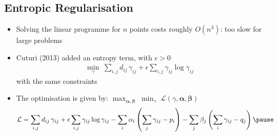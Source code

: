 \begin{slide}
\section[-2]{Entropic Regularisation}

\begin{PauseHighLight}
  \begin{itemize}
  \item Solving the linear programme for $n$ points costs roughly
    $O(n^3)$: too slow for large problems\pause
  \item Cuturi (2013) added an entropy term, with $\epsilon>0$
    \begin{align*}
      \min_{\gamma}\; \sum_{i,j} d_{ij}\,\gamma_{ij} + \epsilon\sum_{i,j}
      \gamma_{ij}\log\gamma_{ij}
    \end{align*}
    with the same constraints\pause
  \item The optimisation is given by: $\displaystyle
    \max_{\bm{\alpha},\bm{\beta}} \; \min_{\gamma}\;
    \mathcal{L}(\gamma, \bm{\alpha}, \bm{\beta})$
    {\small
    \begin{align*}
      \mathcal{L} = \sum_{i,j} d_{ij}\,\gamma_{ij} + \epsilon\sum_{i,j}
      \gamma_{ij}\log\gamma_{ij} - \sum_i \alpha_i \bra{\sum_j
      \gamma_{ij} - p_i}  - \sum_j \beta_j \bra{\sum_i
      \gamma_{ij} - q_j}\pause
    \end{align*}}
  \end{itemize}
\end{PauseHighLight}

\end{slide}


